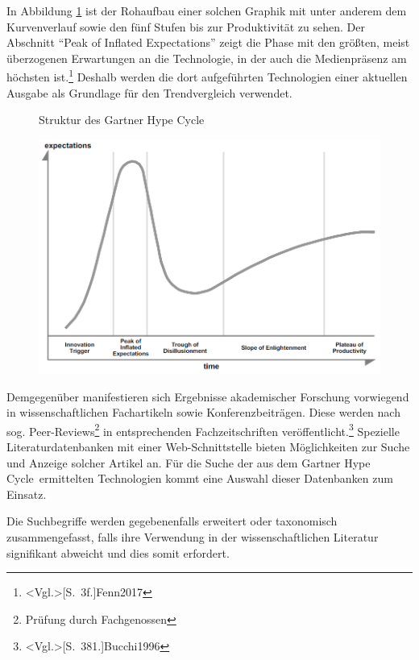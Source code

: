 In Abbildung \ref{fig:ghc_raw} ist der Rohaufbau einer solchen Graphik mit unter anderem dem Kurvenverlauf sowie den fünf Stufen bis zur Produktivität zu sehen. Der Abschnitt "`Peak of Inflated Expectations"' zeigt die Phase mit den größten, meist überzogenen Erwartungen an die Technologie, in der auch die Medienpräsenz am höchsten ist.\footnote{\citeNP<Vgl.>[S.~3f.]{Fenn2017}} Deshalb werden die dort aufgeführten Technologien einer aktuellen Ausgabe als Grundlage für den Trendvergleich verwendet.

\begin{figure}
	\centering
	\caption{Struktur des \glqq Gartner Hype Cycle\grqq}
	\includegraphics[width=0.9\linewidth]{img/ghc_raw}
	\caption*{\protect\fullciteNP<Quelle:>[S.~4]{Fenn2017}}
	\label{fig:ghc_raw}
\end{figure}

Demgegenüber manifestieren sich Ergebnisse akademischer Forschung vorwiegend in wissenschaftlichen Fachartikeln sowie Konferenzbeiträgen. Diese werden nach sog. \glqq Peer-Reviews\grqq \footnote{Prüfung durch Fachgenossen} in entsprechenden Fachzeitschriften veröffentlicht.\footnote{\citeNP<Vgl.>[S.~381.]{Bucchi1996}} Spezielle Literaturdatenbanken mit einer Web-Schnittstelle bieten Möglichkeiten zur Suche und Anzeige solcher Artikel an. Für die Suche der aus dem \glqq Gartner Hype Cycle\grqq~ermittelten Technologien kommt eine Auswahl dieser Datenbanken zum Einsatz.

Die Suchbegriffe werden gegebenenfalls erweitert oder taxonomisch zusammengefasst, falls ihre Verwendung in der wissenschaftlichen Literatur signifikant abweicht und dies somit erfordert.

%
%
